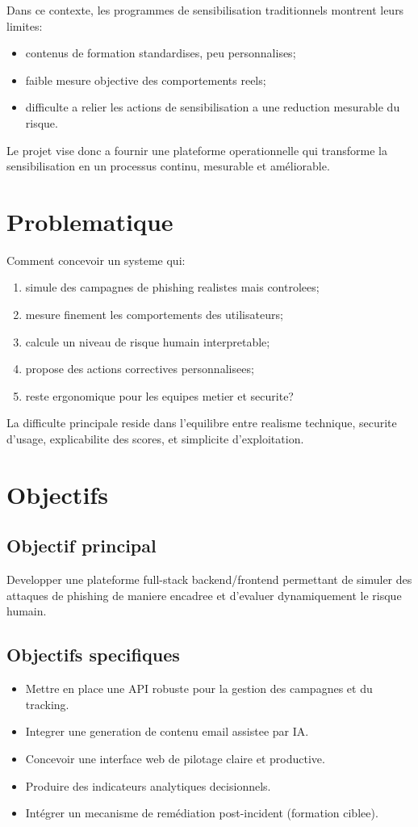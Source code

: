 \documentclass[12pt,a4paper,oneside]{report}
\begin{document}
Dans ce contexte, les programmes de sensibilisation traditionnels montrent leurs limites:
\begin{itemize}[leftmargin=1.2cm]
  \item contenus de formation standardises, peu personnalises;
  \item faible mesure objective des comportements reels;
  \item difficulte a relier les actions de sensibilisation a une reduction mesurable du risque.
\end{itemize}

Le projet vise donc a fournir une plateforme operationnelle qui transforme la sensibilisation en un processus continu, mesurable et améliorable.

\section{Problematique}
Comment concevoir un systeme qui:
\begin{enumerate}[leftmargin=1.2cm]
  \item simule des campagnes de phishing realistes mais controlees;
  \item mesure finement les comportements des utilisateurs;
  \item calcule un niveau de risque humain interpretable;
  \item propose des actions correctives personnalisees;
  \item reste ergonomique pour les equipes metier et securite?
\end{enumerate}

La difficulte principale reside dans l'equilibre entre realisme technique, securite d'usage, explicabilite des scores, et simplicite d'exploitation.

\section{Objectifs}
\subsection{Objectif principal}
Developper une plateforme full-stack backend/frontend permettant de simuler des attaques de phishing de maniere encadree et d'evaluer dynamiquement le risque humain.

\subsection{Objectifs specifiques}
\begin{itemize}[leftmargin=1.2cm]
  \item Mettre en place une API robuste pour la gestion des campagnes et du tracking.
  \item Integrer une generation de contenu email assistee par IA.
  \item Concevoir une interface web de pilotage claire et productive.
  \item Produire des indicateurs analytiques decisionnels.
  \item Intégrer un mecanisme de remédiation post-incident (formation ciblee).
\end{itemize}
\end{document}
